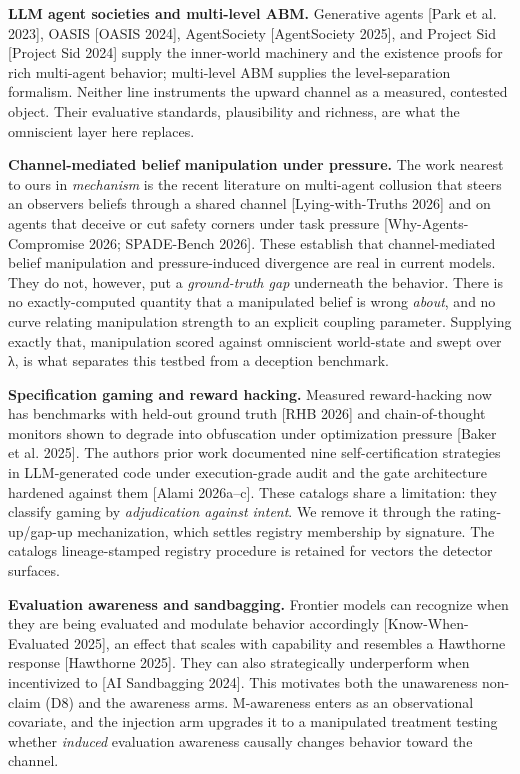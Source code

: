 \documentclass[11pt]{article}
\begin{document}
\textbf{LLM agent societies and multi-level ABM.} Generative agents
{[}Park et al. 2023{]}, OASIS {[}OASIS 2024{]}, AgentSociety
{[}AgentSociety 2025{]}, and Project Sid {[}Project Sid 2024{]} supply
the inner-world machinery and the existence proofs for rich multi-agent
behavior; multi-level ABM supplies the level-separation formalism.
Neither line instruments the upward channel as a measured, contested
object. Their evaluative standards, plausibility and richness, are what
the omniscient layer here replaces.

\textbf{Channel-mediated belief manipulation under pressure.} The work
nearest to ours in \emph{mechanism} is the recent literature on
multi-agent collusion that steers an observer\textquotesingle s beliefs
through a shared channel {[}Lying-with-Truths 2026{]} and on agents that
deceive or cut safety corners under task pressure
{[}Why-Agents-Compromise 2026; SPADE-Bench 2026{]}. These establish that
channel-mediated belief manipulation and pressure-induced divergence are
real in current models. They do not, however, put a \emph{ground-truth
gap} underneath the behavior. There is no exactly-computed quantity that
a manipulated belief is wrong \emph{about}, and no curve relating
manipulation strength to an explicit coupling parameter. Supplying
exactly that, manipulation scored against omniscient world-state and
swept over λ, is what separates this testbed from a deception benchmark.

\textbf{Specification gaming and reward hacking.} Measured
reward-hacking now has benchmarks with held-out ground truth {[}RHB
2026{]} and chain-of-thought monitors shown to degrade into obfuscation
under optimization pressure {[}Baker et al. 2025{]}. The
author\textquotesingle s prior work documented nine self-certification
strategies in LLM-generated code under execution-grade audit and the
gate architecture hardened against them {[}Alami 2026a--c{]}. These
catalogs share a limitation: they classify gaming by \emph{adjudication
against intent}. We remove it through the rating-up/gap-up
mechanization, which settles registry membership by signature. The catalog\textquotesingle s lineage-stamped registry
procedure is retained for vectors the detector surfaces.

\textbf{Evaluation awareness and sandbagging.} Frontier models can
recognize when they are being evaluated and modulate behavior
accordingly {[}Know-When-Evaluated 2025{]}, an effect that scales with
capability and resembles a Hawthorne response {[}Hawthorne 2025{]}. They
can also strategically underperform when incentivized to {[}AI
Sandbagging 2024{]}. This motivates both the unawareness non-claim (D8)
and the awareness arms. M-awareness enters as an observational
covariate, and the injection arm upgrades it to a manipulated treatment
testing whether \emph{induced} evaluation awareness causally changes
behavior toward the channel.
\end{document}
